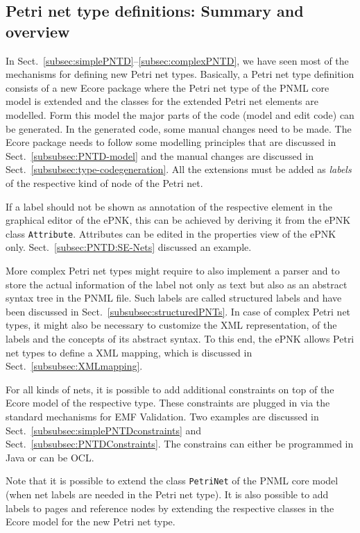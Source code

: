 \subsection{Petri net type definitions: Summary and overview}
\label{subsec:pntd:summary}

In Sect.~\ref{subsec:simplePNTD}--\ref{subsec:complexPNTD}, we have seen most
of the mechanisms for defining new Petri net types. Basically, a Petri net
type definition  consists of a new Ecore package where the Petri net
type of the PNML core model is extended and the classes for the extended Petri
net elements are modelled. Form this model the major parts of the code
(model and edit code) can be generated. In the generated code, some
manual changes need to be made. The Ecore package needs to follow some
modelling principles that are discussed in Sect.~\ref{subsubsec:PNTD-model} and
the manual changes are discussed in Sect.~\ref{subsubsec:type-codegeneration}.
All the extensions must be added as \emph{labels} of the respective kind
of node of the Petri net.

If a label should not be shown as annotation of the respective element
in the graphical editor of the ePNK, this can be achieved by deriving it from
the ePNK class {\tt Attribute}. Attributes can be edited in the properties view
of the ePNK only. Sect.~\ref{subsec:PNTD:SE-Nets} discussed an example.

More complex Petri net types might require to also implement a parser
and to store the actual information of the label not only as text but also
as an abstract syntax tree in the PNML file. Such labels are called
structured labels and have been discussed in
Sect.~\ref{subsubsec:structuredPNTs}. In case of complex Petri net types,
it might also be necessary to customize the XML representation, of the
labels and the concepts of its abstract syntax. To this end, the ePNK
allows Petri net types to define a XML mapping, which is discussed in
Sect.~\ref{subsubsec:XMLmapping}.

For all kinds of nets, it is possible to add additional constraints
on top of the Ecore model of the respective type. These constraints are
plugged in via the standard mechanisms for EMF Validation. Two examples
are discussed in Sect.~\ref{subsubsec:simplePNTDconstraints} and
Sect.~\ref{subsubsec:PNTDConstraints}. The constrains can either be
programmed in Java or can be OCL.

Note that it is possible to extend the class {\tt PetriNet} of
the PNML core model (when net labels are needed in the Petri net type).
It is also possible to add labels to pages and reference nodes by
extending the respective classes in the Ecore model for the new
Petri net type.

